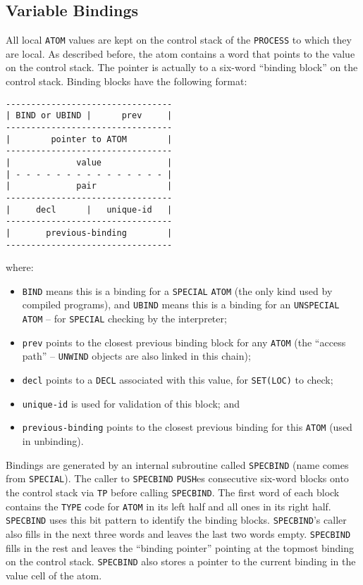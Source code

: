 \documentclass[a4paper,]{article}
\providecommand{\tightlist}{%
  \setlength{\itemsep}{0pt}\setlength{\parskip}{0pt}}
\begin{document}
\subsection{Variable Bindings}\label{variable-bindings}

All local \texttt{ATOM} values are kept on the control stack of the \texttt{PROCESS} to which they are local. As described
before, the atom contains a word that points to the value on the control stack. The pointer is actually to a six-word
``binding block'' on the control stack. Binding blocks have the following format:

\begin{verbatim}
---------------------------------
| BIND or UBIND |      prev     |
---------------------------------
|        pointer to ATOM        |
---------------------------------
|             value             |
| - - - - - - - - - - - - - - - |
|             pair              |
---------------------------------
|     decl      |   unique-id   |
---------------------------------
|       previous-binding        |
---------------------------------
\end{verbatim}

where:

\begin{itemize}
\tightlist
\item
  \texttt{BIND} means this is a binding for a \texttt{SPECIAL} \texttt{ATOM} (the only kind used by
  compiled programs), and \texttt{UBIND} means this is a binding for an \texttt{UNSPECIAL}
  \texttt{ATOM} -- for \texttt{SPECIAL} checking by the interpreter;
\item
  \texttt{prev} points to the closest previous binding block for any \texttt{ATOM} (the ``access path'' --
  \texttt{UNWIND} objects are also linked in this chain);
\item
  \texttt{decl} points to a \texttt{DECL} associated with this value, for \texttt{SET(LOC)} to check;
\item
  \texttt{unique-id} is used for validation of this block; and
\item
  \texttt{previous-binding} points to the closest previous binding for this \texttt{ATOM} (used in unbinding).
\end{itemize}

Bindings are generated by an internal subroutine called \texttt{SPECBIND} (name comes from \texttt{SPECIAL}). The caller to
\texttt{SPECBIND} \texttt{PUSH}es consecutive six-word blocks onto the control stack via \texttt{TP} before calling
\texttt{SPECBIND}. The first word of each block contains the \texttt{TYPE} code for \texttt{ATOM} in its left half and all
ones in its right half. \texttt{SPECBIND} uses this bit pattern to identify the binding blocks. \texttt{SPECBIND}'s caller
also fills in the next three words and leaves the last two words empty. \texttt{SPECBIND} fills in the rest and leaves the
``binding pointer'' pointing at the topmost binding on the control stack. \texttt{SPECBIND} also stores a pointer to the
current binding in the value cell of the atom.
\end{document}
